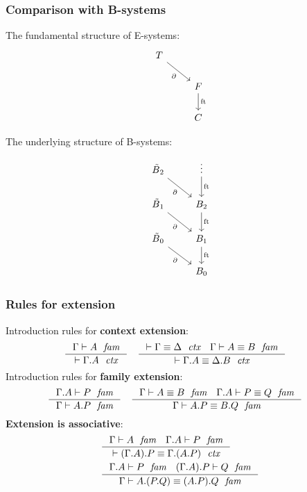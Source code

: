 \documentclass{beamer}
\newcommand\important[1]{\textbf{\color{red!90!black}#1}}
\newcommand{\Btilde}{\skew{4}{\tilde}{B}}
\begin{document}
\begin{frame}
\frametitle{\bf Comparison with B-systems}
\begin{minipage}[t]{.42\textwidth}
The fundamental structure of E-systems:
\\[1.8cm]
\begin{equation*}
\begin{tikzcd}[ampersand replacement=\&]
\stesyst
  \ar{dr}[swap]{\ebd}
  \\
  {}\&
\stesysf
  \ar{d}{\eft}
  \\
  {}\&
\stesysc
\end{tikzcd}
\end{equation*}
\end{minipage}
\hfill
\begin{minipage}[t]{.42\textwidth}
The underlying structure of B-systems:
\vfill
\begin{equation*}
\begin{tikzcd}[ampersand replacement=\&]
\Btilde_2
  \ar{dr}[swap]{\ebd}
  \&
\vdots
  \ar{d}{\eft}
  \\
\Btilde_1
  \ar{dr}[swap]{\ebd}
  \&
B_2
  \ar{d}{\eft}
  \\
\Btilde_0
  \ar{dr}[swap]{\ebd}
  \&
B_1
  \ar{d}{\eft}
  \\
  {}\&
B_0
\end{tikzcd}
\end{equation*}
\end{minipage}
\end{frame}

\begin{frame}
\frametitle{\bf Rules for extension}
Introduction rules for \important{context extension}:
\begin{align*}
& \inference
  { \jfam{\Gamma}{A}
    }
  { \jctx{\ctxext{\Gamma}{A}}
    }
& & \inference
    { \jctxeq{\Gamma}{\Delta}
      \jfameq{\Gamma}{A}{B}
      }
    { \jctxeq{\ctxext{\Gamma}{A}}{\ctxext{\Delta}{B}}
      }
\end{align*}
\pause
Introduction rules for \important{family extension}:
\begin{align*}
& \inference
  { \jfam{{\Gamma}{A}}{P}
    }
  { \jfam{\Gamma}{\ctxext{A}{P}}
    }
& & \inference
    { \jfameq{\Gamma}{A}{B} 
      \jfameq{{\Gamma}{A}}{P}{Q}
      }
    { \jfameq{\Gamma}{\ctxext{A}{P}}{\ctxext{B}{Q}}
      }
\end{align*}
\pause
\important{Extension is associative}:
\begin{align*}
& \inference
  { \jfam{\Gamma}{A}
    \jfam{{\Gamma}{A}}{P}
    }
  { \jctxeq{\ctxext{{\Gamma}{A}}{P}}{\ctxext{\Gamma}{{A}{P}}}
    }
  \\
& \inference
  { \jfam{{\Gamma}{A}}{P}
    \jfam{{{\Gamma}{A}}{P}}{Q}
    }
  { \jfameq{\Gamma}{\ctxext{A}{{P}{Q}}}{\ctxext{{A}{P}}{Q}}
    }
\end{align*}
\end{frame}
\end{document}
